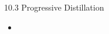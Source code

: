 \begin{frame}{10.3 Progressive Distillation}
    \begin{itemize}
        \item
    \end{itemize}
\end{frame}
